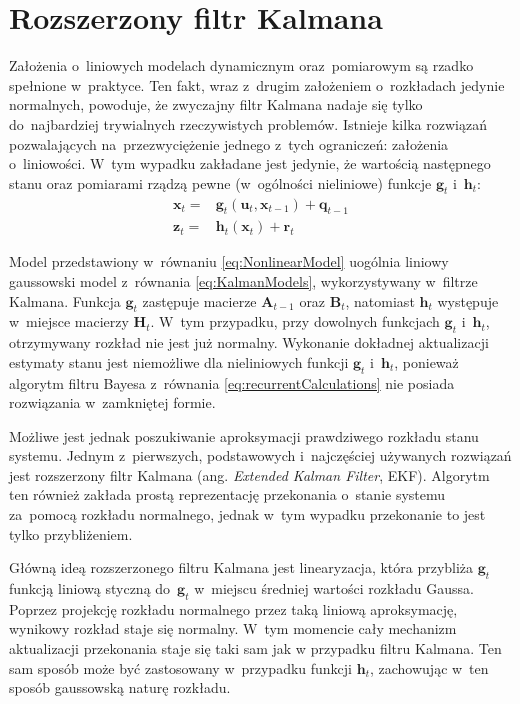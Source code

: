 \section{Rozszerzony filtr Kalmana} \label{ExtendedKalmanFilter}
Założenia o~liniowych modelach dynamicznym oraz~pomiarowym są rzadko spełnione w~praktyce. Ten fakt, wraz z~drugim założeniem o~rozkładach jedynie normalnych, powoduje, że zwyczajny filtr Kalmana nadaje się tylko do~najbardziej trywialnych rzeczywistych problemów. Istnieje kilka rozwiązań pozwalających na~przezwyciężenie jednego z~tych ograniczeń: założenia o~liniowości. W~tym wypadku zakładane jest jedynie, że wartością następnego stanu oraz pomiarami rządzą pewne (w~ogólności nieliniowe) funkcje $\boldsymbol{g}_t$ i~$\boldsymbol{h}_t$:
\begin{align} 
\boldsymbol{x}_t =& \boldsymbol{g}_t(\boldsymbol{u}_t, \boldsymbol{x}_{t-1}) + \boldsymbol{q}_{t-1} \nonumber \\
\boldsymbol{z}_t =& \boldsymbol{h}_t(\boldsymbol{x}_{t}) + \boldsymbol{r}_{t} \label{eq:NonlinearModel}
\end{align}
\par
Model przedstawiony w~równaniu \ref{eq:NonlinearModel} uogólnia liniowy gaussowski model z~równania \ref{eq:KalmanModels}, wykorzystywany w~filtrze Kalmana. Funkcja $\boldsymbol{g}_t$ zastępuje macierze $\boldsymbol{A}_{t-1}$ oraz $\boldsymbol{B}_{t}$, natomiast $\boldsymbol{h}_t$ występuje w~miejsce macierzy $\boldsymbol{H}_t$. W~tym przypadku, przy dowolnych funkcjach $\boldsymbol{g}_t$ i~$\boldsymbol{h}_t$, otrzymywany rozkład nie jest już normalny. Wykonanie dokładnej aktualizacji estymaty stanu jest niemożliwe dla nieliniowych funkcji $\boldsymbol{g}_t$ i~$\boldsymbol{h}_t$, ponieważ algorytm filtru Bayesa z~równania \ref{eq:recurrentCalculations} nie posiada rozwiązania w~zamkniętej formie.
\par
Możliwe jest jednak poszukiwanie aproksymacji prawdziwego rozkładu stanu systemu. Jednym z~pierwszych, podstawowych i~najczęściej używanych rozwiązań jest rozszerzony filtr Kalmana (ang. \textit{Extended Kalman Filter}, EKF). Algorytm ten również zakłada prostą reprezentację przekonania o~stanie systemu za~pomocą rozkładu normalnego, jednak w~tym wypadku przekonanie to jest tylko przybliżeniem.
\par
Główną ideą rozszerzonego filtru Kalmana jest linearyzacja, która przybliża $\boldsymbol{g}_t$ funkcją liniową styczną do~$\boldsymbol{g}_t$ w~miejscu średniej wartości rozkładu Gaussa. Poprzez projekcję rozkładu normalnego przez taką liniową aproksymację, wynikowy rozkład staje się normalny. W~tym momencie cały mechanizm aktualizacji przekonania staje się taki sam jak w przypadku filtru Kalmana. Ten sam sposób może być zastosowany w~przypadku funkcji $\boldsymbol{h}_t$, zachowując w~ten sposób gaussowską naturę rozkładu.
